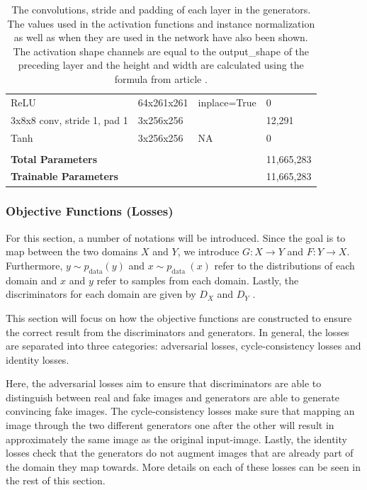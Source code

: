 \documentclass[12pt, fleqn, titlepage]{article}
\begin{document}
\begin{table}[H]
\begin{tabular}{llll}
		ReLU                                        & 64x261x261     & inplace=True& 0             \\
		3x8x8 conv, stride 1, pad 1                 & 3x256x256      &             & 12,291        \\
		Tanh                                        & 3x256x256      & NA          & 0             \\
		                                            &                &             &               \\
		\textbf{Total Parameters}                   &                &             & 11,665,283    \\
		\textbf{Trainable Parameters}               &                &             & 11,665,283    \\ \bottomrule
	\end{tabular}
	\caption{The convolutions, stride and padding of each layer in the generators. The values used in the activation functions and instance normalization as well as when they are used in the network have also been shown. The activation shape channels are equal to the output\_shape of the preceding layer and the height and width are calculated using the formula from article \protect\cite{calculate_activation_shape}.}
	\label{tab:generator_layers}
\end{table}

\subsubsection{Objective Functions (Losses)}
For this section, a number of notations will be introduced. Since the goal is to map between the two domains $X$ and $Y$, we introduce $G : X \rightarrow Y$ and $F : Y \rightarrow X$. Furthermore, $y \sim p_{\text {data}}(y)$ and $x \sim p_{\text {data }}(x)$ refer to the distributions of each domain and $x$ and $y$ refer to samples from each domain. Lastly, the discriminators for each domain are given by $D_X$ and $D_Y$ \cite{original_cyclegan}.

This section will focus on how the objective functions are constructed to ensure the correct result from the discriminators and generators. In general, the losses are separated into three categories: adversarial losses, cycle-consistency losses and identity losses. 

Here, the adversarial losses aim to ensure that discriminators are able to distinguish between real and fake images and generators are able to generate convincing fake images. The cycle-consistency losses make sure that mapping an image through the two different generators one after the other will result in approximately the same image as the original input-image. Lastly, the identity losses check that the generators do not augment images that are already part of the domain they map towards. More details on each of these losses can be seen in the rest of this section.
\end{document}
